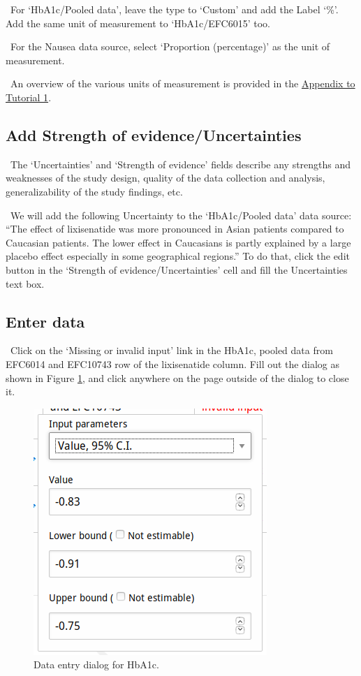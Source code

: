 \documentclass[00_mcda_tutorial.tex]{subfiles}
\begin{document}
\noindent \leftpointright \, For ‘HbA1c/Pooled data’, leave the type to ‘Custom’ and add the Label ‘\%’. Add the same unit of measurement to ‘HbA1c/EFC6015’ too.
\newline

\noindent \leftpointright \, For the Nausea data source, select ‘Proportion (percentage)’ as the unit of measurement.
\newline

\noindent \faGraduationCap \, An overview of the various units of measurement is provided in the \hyperref[appendix1]{Appendix to Tutorial 1}.

\subsection*{Add Strength of evidence/Uncertainties}
\noindent \faGraduationCap \, The ‘Uncertainties’ and ‘Strength of evidence’ fields describe any strengths and weaknesses of the study design, quality of the data collection and analysis, generalizability of the study findings, etc.
\newline

\noindent \leftpointright \, We will add the following Uncertainty to the ‘HbA1c/Pooled data’ data source: “The effect of lixisenatide was more pronounced in Asian patients compared to Caucasian patients. The lower effect in Caucasians is partly explained by a large placebo effect especially in some geographical regions.” To do that, click the edit button in the ‘Strength of evidence/Uncertainties’ cell and fill the Uncertainties text box.

\subsection*{Enter data}
\noindent \leftpointright \, Click on the ‘Missing or invalid input’ link in the HbA1c, pooled data from EFC6014 and EFC10743 row of the lixisenatide column. Fill out the dialog as shown in Figure \ref{fig:data1}, and click anywhere on the page outside of the dialog to close it.

\begin{figure}[!h]
    \centering
	\includegraphics[width=.5\textwidth]{fig/effectsInput.png}
    \caption{Data entry dialog for HbA1c.}
	\label{fig:data1}
\end{figure}
\end{document}
